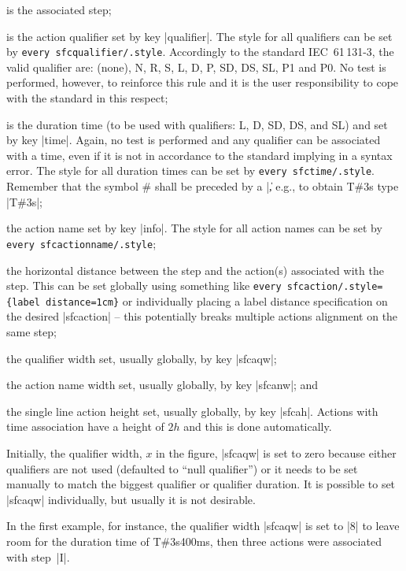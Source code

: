 \documentclass[a4paper]{ltxdoc}
\begin{document}
\begin{description}[align=right,leftmargin=8mm,labelwidth=6mm,labelsep=2mm]
\item[$s$] is the associated step;
\item[$q$] is the action qualifier set by key |qualifier|. The style for all qualifiers can be set by \verb|every sfcqualifier/.style|. Accordingly to the standard IEC~61\,131-3, the valid qualifier are: (none), N, R, S, L, D, P, SD, DS, SL, P1 and P0. No test is performed, however, to reinforce this rule and it is the user responsibility to cope with the standard in this respect;
\item[$t$] is the duration time (to be used with qualifiers: L, D, SD, DS, and SL) and  set by key |time|. Again, no test is performed and any qualifier can be associated with a time, even if it is not in accordance to the standard implying in a syntax error. The style for all duration times can be set by \verb|every sfctime/.style|. Remember that the symbol \# shall be preceded by a |\|, e.g., to obtain T\#3s type |T\#3s|; 
\item[$a$] the action name set by key |info|. The style for all action names can be set by \verb|every sfcactionname/.style|;
\item[$d$] the horizontal distance between the step and the action(s) associated with the step. This can be set globally using something like \verb|every sfcaction/.style={label distance=1cm}| or individually placing a label distance specification on the desired |sfcaction| -- this potentially breaks multiple actions alignment on the same step;
\item[$x$] the qualifier width set, usually globally, by key |sfcaqw|;
\item[$w$] the action name width set, usually globally, by key |sfcanw|; and
\item[$h$] the single line action height set, usually globally, by key |sfcah|. Actions with time association have a height of $2h$ and this is done automatically.
\end{description}
Initially, the qualifier width, $x$ in the figure, |sfcaqw| is set to zero because either qualifiers are not used (defaulted to ``null qualifier'') or it needs to be set manually to match the biggest qualifier or qualifier duration. It is possible to set |sfcaqw| individually, but usually it is not desirable.

In the first example, for instance, the qualifier width |sfcaqw| is set to |8\tikzcircuitssizeunit| to leave room for the duration time of T\#3s400ms, then three actions were associated with step~|I|.
\end{document}
